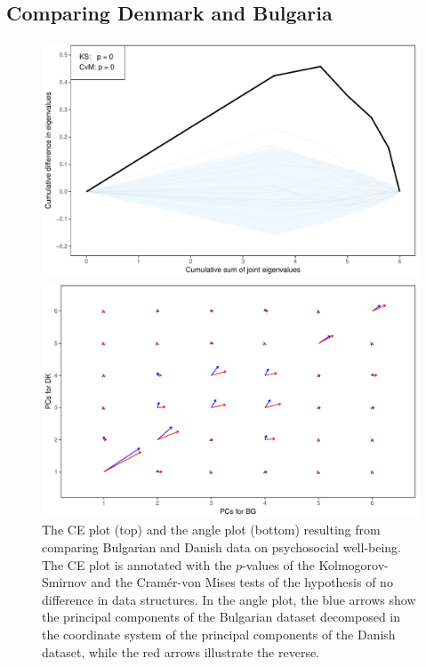 \documentclass[titlepage,11pt,twoside]{article}
\begin{document}
\subsection{Comparing Denmark and Bulgaria}
\begin{figure}
\centerline{\includegraphics[scale = 0.65]{essDKBGce.pdf}}
\centerline{\includegraphics[scale = 0.65]{essDKBGhair.pdf}}
\caption{The CE plot (top) and the angle plot (bottom) resulting from comparing Bulgarian and Danish data on psychosocial well-being. The CE plot is annotated with the $p$-values of the Kolmogorov-Smirnov and the Cram\'er-von Mises tests of the hypothesis of no difference in data structures. In the angle plot, the blue arrows show the principal components of the Bulgarian dataset decomposed in the coordinate system of the principal components of the Danish dataset, while the red arrows illustrate the reverse.}
\label{plotBG.cehair}
\end{figure}
\end{document}

